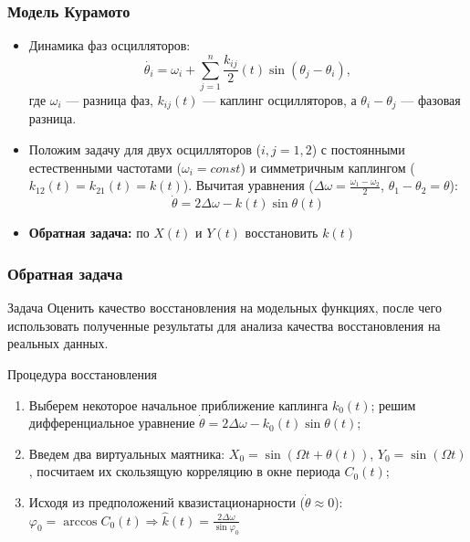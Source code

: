 \documentclass{beamer}
\begin{document}
\begin{frame}
\frametitle{Модель Курамото}
\begin{itemize}
	\item Динамика фаз осцилляторов:
	\[
	\dot{\theta_i} = \omega_i +\sum_{j=1}^n \frac{k_{ij}}{2}(t)\sin\left(\theta_j-\theta_i\right),
	\]
	где $\omega_i$ --- разница фаз, $k_{ij}(t)$ --- каплинг осцилляторов, а $\theta_i-\theta_j$ --- фазовая разница.
	\item Положим задачу для двух осцилляторов ($i,j=1,2$) с постоянными естественными частотами ($\omega_i=const$) и симметричным каплингом ($k_{12}(t)=k_{21}(t)=k(t)$). Вычитая уравнения ($\Delta\omega=\frac{\omega_1-\omega_2}{2}$, $\theta_1-\theta_2=\theta$):
	\[
		\dot{\theta}=2\Delta \omega - k(t)\sin \theta(t)
	\]
	\item \textbf{Обратная задача:} по $X(t)$ и $Y(t)$ восстановить $k(t)$
\end{itemize}
\end{frame}

\begin{frame}
\frametitle{Обратная задача}
\begin{alertblock}{Задача}
	Оценить качество восстановления на модельных функциях, после чего использовать полученные результаты для анализа качества восстановления на реальных данных.
\end{alertblock}
\begin{exampleblock}{Процедура восстановления}
\begin{enumerate}
	\item Выберем некоторое начальное приближение каплинга $k_0(t)$; решим дифференциальное уравнение $\dot{\theta}=2\Delta \omega - k_0(t)\sin \theta(t)$;
	\item Введем два виртуальных маятника: $X_0=\sin(\Omega t+\theta(t))$, $Y_0=\sin(\Omega t)$, посчитаем их скользящую корреляцию в окне периода $C_0(t)$;
	\item Исходя из предположений квазистационарности ($\dot{\theta} \approx 0$): $\varphi_0=\arccos C_0(t) \Rightarrow \hat{k}(t)=\frac{2\Delta \omega}{\sin\varphi_0}$
\end{enumerate}
\end{exampleblock}
\end{frame}
\end{document}
